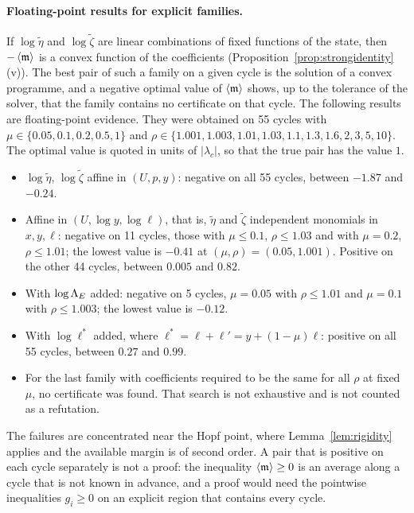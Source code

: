 \paragraph{Floating-point results for explicit families.}
If $\log\tilde\eta$ and $\log\tilde\zeta$ are linear combinations of fixed functions of the state, then $-\left\langle \mathfrak m\right\rangle$ is a convex function of the coefficients (Proposition~\ref{prop:strongidentity}(v)). The best pair of such a family on a given cycle is the solution of a convex programme, and a negative optimal value of $\left\langle \mathfrak m\right\rangle$ shows, up to the tolerance of the solver, that the family contains no certificate on that cycle. The following results are floating-point evidence. They were obtained on 55 cycles with $\mu\in\{0.05,0.1,0.2,0.5,1\}$ and $\rho\in\{1.001,1.003,1.01,1.03,1.1,1.3,1.6,2,3,5,10\}$. The optimal value is quoted in units of $|\lambda_c|$, so that the true pair has the value $1$.
\begin{itemize}
\item $\log\tilde\eta$, $\log\tilde\zeta$ affine in $(U,p,y)$: negative on all 55 cycles, between $-1.87$ and $-0.24$.
\item Affine in $(U,\log y,\log\ell)$, that is, $\tilde\eta$ and $\tilde\zeta$ independent monomials in $x,y,\ell$: negative on 11 cycles, those with $\mu\le0.1$, $\rho\le1.03$ and with $\mu=0.2$, $\rho\le1.01$; the lowest value is $-0.41$ at $(\mu,\rho)=(0.05,1.001)$. Positive on the other 44 cycles, between $0.005$ and $0.82$.
\item With $\log\Lambda_E$ added: negative on 5 cycles, $\mu=0.05$ with $\rho\le1.01$ and $\mu=0.1$ with $\rho\le1.003$; the lowest value is $-0.12$.
\item With $\log\ell^*$ added, where $\ell^*=\ell+\ell'=y+(1-\mu)\ell$: positive on all 55 cycles, between $0.27$ and $0.99$.
\item For the last family with coefficients required to be the same for all $\rho$ at fixed $\mu$, no certificate was found. That search is not exhaustive and is not counted as a refutation.
\end{itemize}
The failures are concentrated near the Hopf point, where Lemma~\ref{lem:rigidity} applies and the available margin is of second order. A pair that is positive on each cycle separately is not a proof: the inequality $\left\langle \mathfrak m\right\rangle\ge0$ is an average along a cycle that is not known in advance, and a proof would need the pointwise inequalities $g_i\ge0$ on an explicit region that contains every cycle.

